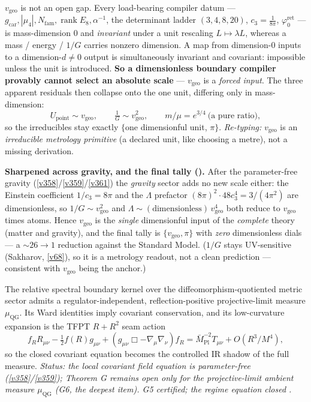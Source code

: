 \documentclass[11pt,a4paper]{article}
\newcommand{\phiz}{\varphi_0^{\mathrm{ret}}}
\newcommand{\cthree}{c_3}
\newcommand{\Mpl}{\bar M_{\mathrm{Pl}}}
\newcommand{\Nfam}{N_{\mathrm{fam}}}
\newcommand{\gcar}{g_{\mathrm{car}}}
\begin{document}
\begin{keybox}
$v_{\mathrm{geo}}$ is not an open gap. Every load-bearing compiler datum --- $\gcar,|\mu_4|,\Nfam,\operatorname{rank}E_8,
\alpha^{-1}$, the determinant ladder $(3,4,8,20)$, $\cthree=\tfrac1{8\pi}$, $\phiz$ --- is mass-dimension $0$ and
\emph{invariant} under a unit rescaling $L\mapsto\lambda L$, whereas a mass / energy / $1/G$ carries nonzero
dimension. A map from dimension-$0$ inputs to a dimension-$d{\neq}0$ output is simultaneously invariant and
covariant: impossible unless the unit is introduced. \textbf{So a dimensionless boundary compiler provably
cannot select an absolute scale} --- $v_{\mathrm{geo}}$ is a \emph{forced input}. The three apparent residuals
then collapse onto the one unit, differing only in mass-dimension:
\[
  U_{\mathrm{point}}\sim v_{\mathrm{geo}},\qquad \tfrac1G\sim v_{\mathrm{geo}}^2,\qquad m/\mu=e^{3/4}\ \text{(a pure ratio)},
\]
so the irreducibles stay exactly $\{$one dimensionful unit, $\pi\}$. \emph{Re-typing:} $v_{\mathrm{geo}}$ is an
\emph{irreducible metrology primitive} (a declared unit, like choosing a metre), not a missing derivation.
\par\smallskip\noindent\textbf{Sharpened across gravity, and the final tally ().} After the
parameter-free gravity (\vref{v358}/\vref{v359}/\vref{v361}) the \emph{gravity} sector adds no new scale either: the
Einstein coefficient $1/\cthree=8\pi$ and the $\Lambda$ prefactor $(8\pi)^2\!\cdot\!48\cthree^4=3/(4\pi^2)$ are
dimensionless, so $1/G\sim v_{\mathrm{geo}}^2$ and $\Lambda\sim(\text{dimensionless})\,v_{\mathrm{geo}}^4$ both reduce
to $v_{\mathrm{geo}}$ times atoms. Hence $v_{\mathrm{geo}}$ is the \emph{single} dimensionful input of the
\emph{complete} theory (matter and gravity), and the final tally is $\{v_{\mathrm{geo}},\pi\}$ with \emph{zero}
dimensionless dials --- a ${\sim}26\to1$ reduction against the Standard Model. ($1/G$ stays UV-sensitive (Sakharov,
\vref{v68}), so it is a metrology readout, not a clean prediction --- consistent with $v_{\mathrm{geo}}$ being the
anchor.)
\end{keybox}

\begin{keybox}
The relative spectral boundary kernel over the diffeomorphism-quotiented metric sector admits a
regulator-independent, reflection-positive projective-limit measure $\mu_{\mathrm{QG}}$. Its Ward
identities imply covariant conservation, and its low-curvature expansion is the TFPT $R+R^2$ seam action
\[
  f_R R_{\mu\nu}-\tfrac12 f(R)g_{\mu\nu}+(g_{\mu\nu}\Box-\nabla_\mu\nabla_\nu)f_R
  =\Mpl^{-2}T_{\mu\nu}+O(R^3/M^4),
\]
so the closed covariant equation becomes the controlled IR shadow of the full measure. \emph{Status: the
local covariant field equation is parameter-free (\vref{v358}/\vref{v359}); Theorem G remains open only for
the projective-limit ambient \emph{measure} $\mu_{\mathrm{QG}}$ (G6, the deepest item). G5 certified; the
regime equation closed .}
\end{keybox}
\end{document}
